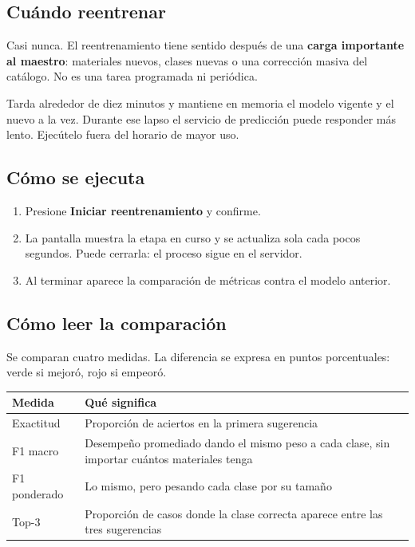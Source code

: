 
\subsection{Cuándo reentrenar}

Casi nunca. El reentrenamiento tiene sentido después de una \textbf{carga
importante al maestro}: materiales nuevos, clases nuevas o una corrección
masiva del catálogo. No es una tarea programada ni periódica.

\begin{aviso}
Tarda alrededor de diez minutos y mantiene en memoria el modelo vigente y el
nuevo a la vez. Durante ese lapso el servicio de predicción puede responder más
lento. Ejecútelo fuera del horario de mayor uso.
\end{aviso}

\subsection{Cómo se ejecuta}

\begin{enumerate}[leftmargin=*, itemsep=3pt]
  \item Presione \textbf{Iniciar reentrenamiento} y confirme.
  \item La pantalla muestra la etapa en curso y se actualiza sola cada pocos
        segundos. Puede cerrarla: el proceso sigue en el servidor.
  \item Al terminar aparece la comparación de métricas contra el modelo
        anterior.
\end{enumerate}


\subsection{Cómo leer la comparación}

Se comparan cuatro medidas. La diferencia se expresa en puntos porcentuales:
verde si mejoró, rojo si empeoró.

\begin{center}
\begin{tabular}{@{}lp{9.2cm}@{}}
\toprule
\textbf{Medida} & \textbf{Qué significa} \\
\midrule
Exactitud     & Proporción de aciertos en la primera sugerencia \\
F1 macro      & Desempeño promediado dando el mismo peso a cada clase, sin importar cuántos materiales tenga \\
F1 ponderado  & Lo mismo, pero pesando cada clase por su tamaño \\
Top-3         & Proporción de casos donde la clase correcta aparece entre las tres sugerencias \\
\bottomrule
\end{tabular}
\end{center}

